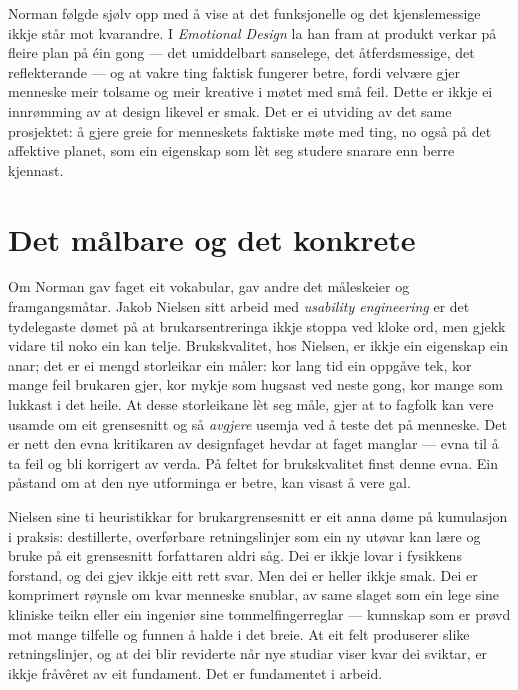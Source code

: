 Norman følgde sjølv opp med å vise at det funksjonelle og det kjenslemessige ikkje står mot kvarandre. I \emph{Emotional Design} \autocite{norman2004emotional} la han fram at produkt verkar på fleire plan på éin gong — det umiddelbart sanselege, det åtferdsmessige, det reflekterande — og at vakre ting faktisk fungerer betre, fordi velvære gjer menneske meir tolsame og meir kreative i møtet med små feil. Dette er ikkje ei innrømming av at design likevel er smak. Det er ei utviding av det same prosjektet: å gjere greie for menneskets faktiske møte med ting, no også på det affektive planet, som ein eigenskap som lèt seg studere snarare enn berre kjennast.

\section{Det målbare og det konkrete}

Om Norman gav faget eit vokabular, gav andre det måleskeier og framgangsmåtar. Jakob Nielsen sitt arbeid med \emph{usability engineering} \autocite{nielsen1993} er det tydelegaste dømet på at brukarsentreringa ikkje stoppa ved kloke ord, men gjekk vidare til noko ein kan telje. Brukskvalitet, hos Nielsen, er ikkje ein eigenskap ein anar; det er ei mengd storleikar ein måler: kor lang tid ein oppgåve tek, kor mange feil brukaren gjer, kor mykje som hugsast ved neste gong, kor mange som lukkast i det heile. At desse storleikane lèt seg måle, gjer at to fagfolk kan vere usamde om eit grensesnitt og så \emph{avgjere} usemja ved å teste det på menneske. Det er nett den evna kritikaren av designfaget hevdar at faget manglar — evna til å ta feil og bli korrigert av verda. På feltet for brukskvalitet finst denne evna. Ein påstand om at den nye utforminga er betre, kan visast å vere gal.

Nielsen sine ti heuristikkar for brukargrensesnitt er eit anna døme på kumulasjon i praksis: destillerte, overførbare retningslinjer som ein ny utøvar kan lære og bruke på eit grensesnitt forfattaren aldri såg. Dei er ikkje lovar i fysikkens forstand, og dei gjev ikkje eitt rett svar. Men dei er heller ikkje smak. Dei er komprimert røynsle om kvar menneske snublar, av same slaget som ein lege sine kliniske teikn eller ein ingeniør sine tommelfingerreglar — kunnskap som er prøvd mot mange tilfelle og funnen å halde i det breie. At eit felt produserer slike retningslinjer, og at dei blir reviderte når nye studiar viser kvar dei sviktar, er ikkje fråvêret av eit fundament. Det er fundamentet i arbeid.

